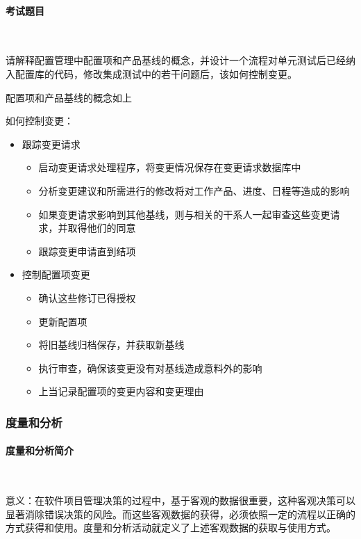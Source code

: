 \paragraph{考试题目}~{} \par
\begin{problem}
请解释配置管理中配置项和产品基线的概念，并设计一个流程对单元测试后已经纳入配置库的代码，修改集成测试中的若干问题后，该如何控制变更。

配置项和产品基线的概念如上

如何控制变更：
\begin{itemize}
    \item 跟踪变更请求
    \begin{itemize}
        \item 启动变更请求处理程序，将变更情况保存在变更请求数据库中
        \item 分析变更建议和所需进行的修改将对工作产品、进度、日程等造成的影响
        \item 如果变更请求影响到其他基线，则与相关的干系人一起审查这些变更请求，并取得他们的同意
        \item 跟踪变更申请直到结项
    \end{itemize}
    \item 控制配置项变更
    \vspace{-0.8em}
    \begin{multicols}{2}
        \begin{itemize}
            \item 确认这些修订已得授权
            \item 更新配置项
            \item 将旧基线归档保存，并获取新基线
            \item 执行审查，确保该变更没有对基线造成意料外的影响
            \item 上当记录配置项的变更内容和变更理由
        \end{itemize}
    \end{multicols}
    \vspace{-1em}
\end{itemize}
\end{problem}

\subsubsection{度量和分析}
\paragraph{度量和分析简介}~{} \par
意义：在软件项目管理决策的过程中，基于客观的数据很重要，这种客观决策可以显著消除错误决策的风险。而这些客观数据的获得，必须依照一定的流程以正确的方式获得和使用。度量和分析活动就定义了上述客观数据的获取与使用方式。

